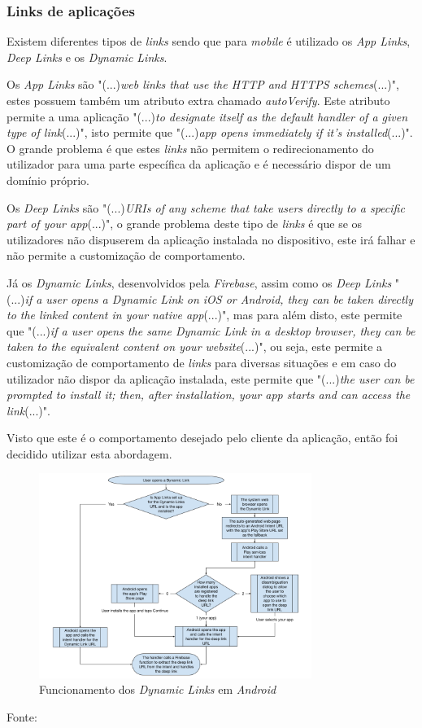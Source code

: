 \subsubsection{Links de aplicações}

Existem diferentes tipos de \textit{links} sendo que para \textit{mobile} é utilizado os \textit{App Links}, \textit{Deep Links} e os \textit{Dynamic Links}.

Os \emph{App Links} são "(...)\emph{web links that use the HTTP and HTTPS schemes}(...)"\citep{linking}, estes possuem também um atributo extra chamado \textit{autoVerify}. Este atributo permite a uma aplicação "(...)\emph{to designate itself as the default handler of a given type of link}(...)"\citep{linking}, isto permite que "(...)\emph{app opens immediately if it's installed}(...)"\citep{linking}. O grande problema é que estes \textit{links} não permitem o redirecionamento do utilizador para uma parte específica da aplicação e é necessário dispor de um domínio próprio.


Os \textit{Deep Links} são "(...)\emph{URIs of any scheme that take users directly to a specific part of your app}(...)"\citep{linking}, o grande problema deste tipo de \textit{links} é que se os utilizadores não dispuserem da aplicação instalada no dispositivo, este irá falhar e não permite a customização de comportamento.

Já os \textit{Dynamic Links}, desenvolvidos pela \textit{Firebase}, assim como os \textit{Deep Links} "(...)\emph{if a user opens a Dynamic Link on iOS or Android, they can be taken directly to the linked content in your native app}(...)"\citep{dynamic_linking}, mas para além disto, este permite que "(...)\emph{if a user opens the same Dynamic Link in a desktop browser, they can be taken to the equivalent content on your website}(...)"\citep{dynamic_linking}, ou seja, este permite a customização de comportamento de \textit{links} para diversas situações e em caso do utilizador não dispor da aplicação instalada, este permite que "(...)\emph{the user can be prompted to install it; then, after installation, your app starts and can access the link}(...)"\citep{dynamic_linking}. 

\newpage

Visto que este é o comportamento desejado pelo cliente da aplicação, então foi decidido utilizar esta abordagem.

\begin{figure}[htb]
  \centering
  \includegraphics[width=0.79\textwidth]{images/diagramas/fdl-android-integration.png}
  \caption{Funcionamento dos \textit{Dynamic Links} em \textit{Android} }
  \label{fig:23}
\end{figure}
Fonte: \citep{linking_firebase}

